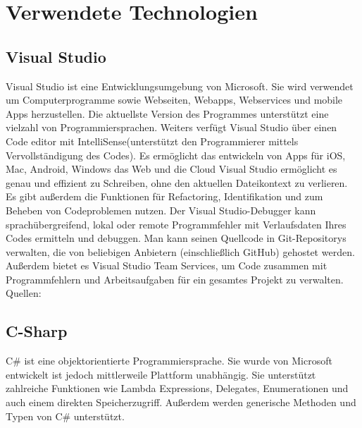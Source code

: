 \chapter{Verwendete Technologien}\label{cha:theoretical-background}

\section{Visual Studio}
Visual Studio ist eine Entwicklungsumgebung von Microsoft. Sie wird verwendet um Computerprogramme sowie Webseiten, Webapps, Webservices und mobile Apps herzustellen. Die aktuellste Version des Programmes unterstützt eine vielzahl von Programmiersprachen.
Weiters verfügt Visual Studio über einen Code editor mit IntelliSense(unterstützt den Programmierer mittels Vervollständigung des Codes). Es ermöglicht das entwickeln von Apps für iOS, Mac, Android, Windows das Web und die Cloud
Visual Studio ermöglicht es genau und effizient zu Schreiben, ohne den aktuellen Dateikontext zu verlieren. Es gibt außerdem die Funktionen für Refactoring, Identifikation und zum Beheben von Codeproblemen nutzen.
Der Visual Studio-Debugger kann sprachübergreifend, lokal oder remote Programmfehler mit Verlaufsdaten Ihres Codes ermitteln und debuggen.
Man kann seinen Quellcode in Git-Repositorys verwalten, die von beliebigen Anbietern (einschließlich GitHub) gehostet werden. Außerdem bietet es Visual Studio Team Services, um Code zusammen mit Programmfehlern und Arbeitsaufgaben für ein gesamtes Projekt zu verwalten.
Quellen: \cite{webster_visual_????}

\section{C-Sharp}
C\# ist eine objektorientierte Programmiersprache. Sie wurde von Microsoft entwickelt ist jedoch mittlerweile Plattform unabhängig. Sie unterstützt zahlreiche Funktionen wie Lambda Expressions, Delegates, Enumerationen und auch einem direkten Speicherzugriff. Außerdem werden generische Methoden und Typen von C\# unterstützt.



